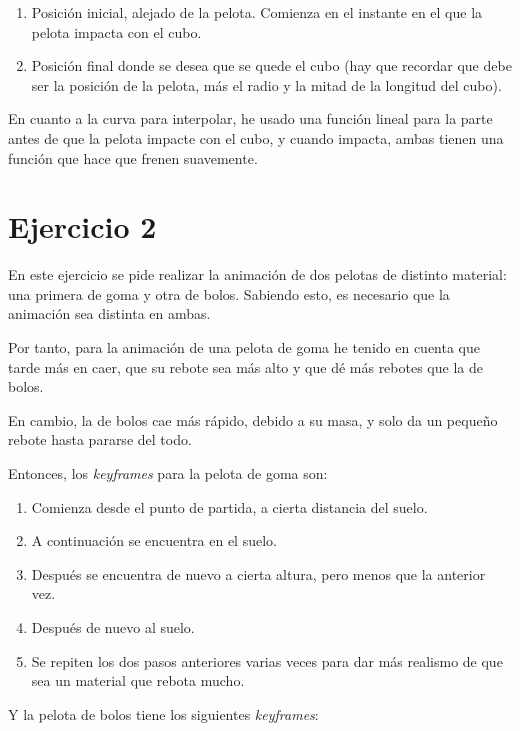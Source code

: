\documentclass{article}
\begin{document}
\begin{enumerate}
    \item Posición inicial, alejado de la pelota. Comienza en el instante en el que la pelota impacta con el cubo.
    \item Posición final donde se desea que se quede el cubo (hay que recordar que debe ser la posición de la pelota, más el radio y la mitad de la longitud del cubo).
\end{enumerate}

En cuanto a la curva para interpolar, he usado una función lineal para la parte antes de que la pelota impacte con el cubo, y cuando impacta, ambas tienen una función que hace que frenen suavemente.



\section{Ejercicio 2}

En este ejercicio se pide realizar la animación de dos pelotas de distinto material: una primera de goma y otra de bolos. Sabiendo esto, es necesario que la animación sea distinta en ambas.

Por tanto, para la animación de una pelota de goma he tenido en cuenta que tarde más en caer, que su rebote sea más alto y que dé más rebotes que la de bolos.

En cambio, la de bolos cae más rápido, debido a su masa, y solo da un pequeño rebote hasta pararse del todo.


Entonces, los \textit{keyframes} para la pelota de goma son:

\begin{enumerate}
    \item Comienza desde el punto de partida, a cierta distancia del suelo.
    \item A continuación se encuentra en el suelo.
    \item Después se encuentra de nuevo a cierta altura, pero menos que la anterior vez.
    \item Después de nuevo al suelo.
    \item Se repiten los dos pasos anteriores varias veces para dar más realismo de que sea un material que rebota mucho.
\end{enumerate}


Y la pelota de bolos tiene los siguientes \textit{keyframes}:
\end{document}
